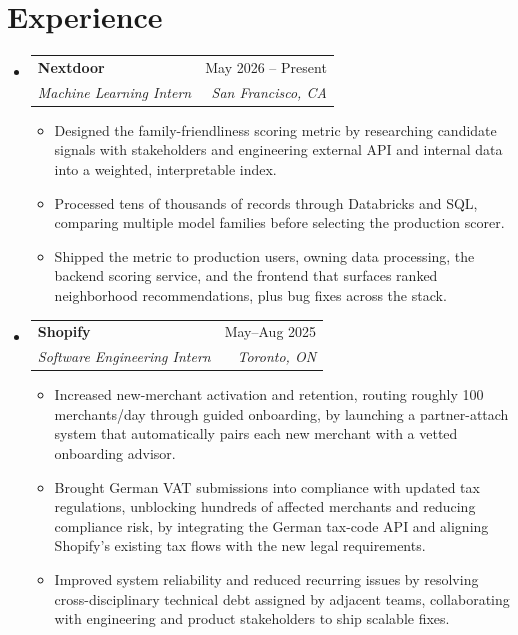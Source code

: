 \documentclass[letterpaper,11pt]{article}
\makeatletter
\newcommand{\resumeItem}[1]{
  \item\small{
    {#1 \vspace{-3pt}}
  }
}
\newcommand{\resumeSubheading}[4]{
  \vspace{-2pt}\item
    \begin{tabular*}{0.97\textwidth}[t]{l@{\extracolsep{\fill}}r}
      \textbf{#1} & #2 \\
      \textit{\small#3} & \textit{\small #4} \\
    \end{tabular*}\vspace{-5pt}
}
\newcommand{\resumeSubHeadingListStart}{\begin{itemize}[leftmargin=0.15in, label={}]}
\newcommand{\resumeSubHeadingListEnd}{\end{itemize}}
\newcommand{\resumeItemListStart}{\begin{itemize}}
\newcommand{\resumeItemListEnd}{\end{itemize}\vspace{-9pt}}
\makeatother
\begin{document}
\section{Experience}
  \resumeSubHeadingListStart
    \resumeSubheading
      {Nextdoor}{May 2026 -- Present}
      {Machine Learning Intern}{San Francisco, CA}
      \resumeItemListStart
        \resumeItem{Designed the family-friendliness scoring metric by researching candidate signals with stakeholders and engineering external API and internal data into a weighted, interpretable index.}
        \resumeItem{Processed tens of thousands of records through Databricks and SQL, comparing multiple model families before selecting the production scorer.}
        \resumeItem{Shipped the metric to production users, owning data processing, the backend scoring service, and the frontend that surfaces ranked neighborhood recommendations, plus bug fixes across the stack.}
      \resumeItemListEnd
    \resumeSubheading
      {Shopify}{May--Aug 2025}
      {Software Engineering Intern}{Toronto, ON}
      \resumeItemListStart
        \resumeItem{Increased new-merchant activation and retention, routing roughly 100 merchants/day through guided onboarding, by launching a partner-attach system that automatically pairs each new merchant with a vetted onboarding advisor.}
        \resumeItem{Brought German VAT submissions into compliance with updated tax regulations, unblocking hundreds of affected merchants and reducing compliance risk, by integrating the German tax-code API and aligning Shopify's existing tax flows with the new legal requirements.}
        \resumeItem{Improved system reliability and reduced recurring issues by resolving cross-disciplinary technical debt assigned by adjacent teams, collaborating with engineering and product stakeholders to ship scalable fixes.}
      \resumeItemListEnd
  \resumeSubHeadingListEnd
\end{document}
